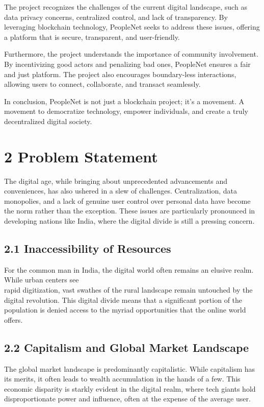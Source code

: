 \documentclass[10pt]{article}
\begin{document}
The project recognizes the challenges of the current digital landscape, such as data privacy concerns, centralized control, and lack of transparency. By leveraging blockchain technology, PeopleNet seeks to address these issues, offering a platform that is secure, transparent, and user-friendly.

Furthermore, the project understands the importance of community involvement. By incentivizing good actors and penalizing bad ones, PeopleNet ensures a fair and just platform. The project also encourages boundary-less interactions, allowing users to connect, collaborate, and transact seamlessly.

In conclusion, PeopleNet is not just a blockchain project; it's a movement. A movement to democratize technology, empower individuals, and create a truly decentralized digital society.

\section*{2 Problem Statement}
The digital age, while bringing about unprecedented advancements and conveniences, has also ushered in a slew of challenges. Centralization, data monopolies, and a lack of genuine user control over personal data have become the norm rather than the exception. These issues are particularly pronounced in developing nations like India, where the digital divide is still a pressing concern.

\subsection*{2.1 Inaccessibility of Resources}
For the common man in India, the digital world often remains an elusive realm. While urban centers see\\
rapid digitization, vast swathes of the rural landscape remain untouched by the digital revolution. This digital divide means that a significant portion of the population is denied access to the myriad opportunities that the online world offers.

\subsection*{2.2 Capitalism and Global Market Landscape}
The global market landscape is predominantly capitalistic. While capitalism has its merits, it often leads to wealth accumulation in the hands of a few. This economic disparity is starkly evident in the digital realm, where tech giants hold disproportionate power and influence, often at the expense of the average user.
\end{document}
